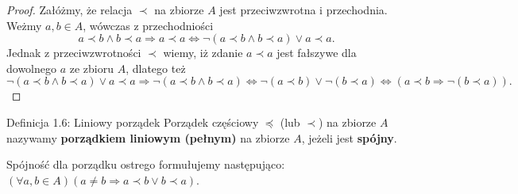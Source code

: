 \documentclass{article}
\newcommand{\ifff}{\Leftrightarrow}
\newcommand{\imp}{\Rightarrow}
\begin{document}
\begin{proof}
    Załóżmy, że relacja $\prec$ na zbiorze $A$ jest przeciwzwrotna i przechodnia. Weżmy $a, b\in A$,
    wówczas z przechodniości
    \begin{equation*}
        a \prec b \land b \prec a \imp a \prec a \ifff \lnot(a \prec b \land b \prec a) \lor a \prec a.
    \end{equation*}
    Jednak z przeciwzwrotności $\prec$ wiemy, iż zdanie $a\prec a$ jest fałszywe dla dowolnego $a$ ze
    zbioru $A$, dlatego też
    \begin{equation*}
        \lnot(a \prec b \land b \prec a) \lor a \prec a \imp \lnot(a \prec b \land b \prec a)\ifff
        \lnot (a \prec b) \lor \lnot (b \prec a) \ifff (a\prec b\imp \lnot(b\prec a)).
    \end{equation*}
\end{proof}

\begin{defr}{Definicja 1.6: Liniowy porządek}
    Porządek częściowy $\preceq$ (lub $\prec$) na zbiorze $A$ nazywamy \textbf{porządkiem liniowym (pełnym)}
    na zbiorze $A$, jeżeli jest \textbf{spójny}.
\end{defr}

Spójność dla porządku ostrego formułujemy następująco: $(\forall a,b\in A)(a\ne b\imp a\prec b \lor b\prec a)$.
\end{document}
